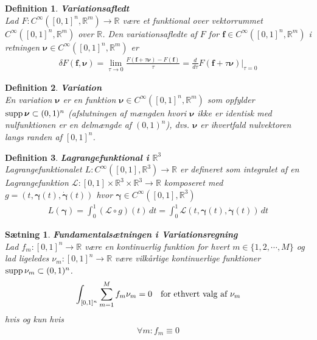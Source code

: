 \documentclass[12pt]{article}
\newtheorem{thm}{Sætning}
\newtheorem{dfn}{Definition}
\begin{document}
\begin{dfn} {\bf Variationsafledt}\\
Lad $F : C^\infty ([0,1]^n, \mathbb{R}^m) \to \mathbb{R}$ være et funktional over vektorrummet $C^\infty([0,1]^n, \mathbb{R}^m)$ over $\mathbb{R}$. Den variationsafledte af $F$ for $\mathbf{f}\in C^\infty ([0,1]^n, \mathbb{R}^m)$ i retningen ${\boldsymbol \nu}\in C^\infty ([0,1]^n, \mathbb{R}^m)$ er
\begin{align*}
\delta F(\mathbf{f}, {\boldsymbol \nu}) = \lim_{\tau \to 0} \frac{F(\mathbf{f}+\tau{\boldsymbol \nu})-F(\mathbf{f})}{\tau} = \frac{d}{d\tau} F(\mathbf{f}+\tau {\boldsymbol \nu}) \Big|_{\tau = 0}
\end{align*}
\end{dfn}


\begin{dfn} {\bf Variation}\\
En variation ${\boldsymbol \nu}$ er en funktion ${\boldsymbol \nu} \in C^\infty ([0,1]^n, \mathbb{R}^m)$ som opfylder $\textnormal{supp}\, {\boldsymbol \nu} \subset (0,1)^n$ (afslutningen af mængden hvori ${\boldsymbol \nu}$ ikke er identisk med nulfunktionen er en delmængde af $ (0,1)^n$), dvs. ${\boldsymbol \nu}$ er ihvertfald nulvektoren langs randen af $[0,1]^n$.
\end{dfn}


\begin{dfn} {\bf Lagrangefunktional i $\mathbb{R}^3$}\\
Lagrangefunktionalet $L : C^\infty ([0,1], \mathbb{R}^3) \to \mathbb{R}$ er defineret som integralet af en Lagrangefunktion $\mathcal{L} : [0,1] \times \mathbb{R}^3 \times \mathbb{R}^3 \to \mathbb{R}$ komposeret med $g=(t,{\boldsymbol \gamma}(t),\dot{\boldsymbol \gamma}(t))$ hvor ${\boldsymbol \gamma} \in C^\infty ([0,1], \mathbb{R}^3)$
\begin{align*}
L({\boldsymbol \gamma})= \int_0^1 (\mathcal{L}\circ g)(t) \, dt =\int_0^1 \mathcal{L}(t, {\boldsymbol \gamma}(t),\dot{{\boldsymbol \gamma}}(t)) \, dt
\end{align*}
\end{dfn}


\begin{thm} {\bf Fundamentalsætningen i Variationsregning}\\
Lad $f_m : [0,1]^n \to \mathbb{R}$ være en kontinuerlig funktion for hvert $m \in \{1, 2, \cdots, M \}$ og lad ligeledes $\nu_m : [0,1]^n \to \mathbb{R}$ være vilkårlige kontinuerlige funktioner $\textnormal{supp}\, \nu_m \subset (0,1)^n$.
\begin{align*}
\int_{[0,1]^n} \sum_{m=1}^M f_m \nu_m = 0 \quad \textnormal{for ethvert valg af $\nu_m$}
\end{align*}
hvis og kun hvis 
\begin{align*}
\forall m : f_m \equiv 0
\end{align*}
\end{thm}
\end{document}

